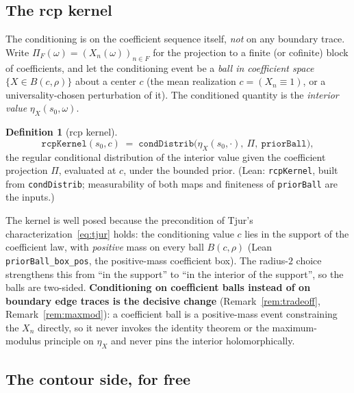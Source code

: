 \documentclass[11pt,a4paper]{article}
\theoremstyle{definition}
\newtheorem{definition}[theorem]{Definition}
\newcommand{\etaX}{\eta_X}
\begin{document}
\subsection{The rcp kernel}\label{sec:kernel}

The conditioning is on the coefficient sequence itself, \emph{not} on any boundary trace.
Write \(\Pi_F(\omega)=(X_n(\omega))_{n\in F}\) for the projection to a finite (or cofinite)
block of coefficients, and let the conditioning event be a \emph{ball in coefficient space}
\(\{X\in B(c,\rho)\}\) about a center \(c\) (the mean realization \(c=(X_n\equiv1)\), or a
universality-chosen perturbation of it). The conditioned quantity is the \emph{interior
value} \(\etaX(s_0,\omega)\).

\begin{definition}[rcp kernel]\label{def:kernel}
\[
  \texttt{rcpKernel}(s_0,c)
  \;=\; \texttt{condDistrib}\bigl(\etaX(s_0,\cdot),\ \Pi,\ \texttt{priorBall}\bigr),
\]
the regular conditional distribution of the interior value given the coefficient projection
\(\Pi\), evaluated at \(c\), under the bounded prior. (Lean: \texttt{rcpKernel}, built from
\texttt{condDistrib}; measurability of both maps and finiteness of \texttt{priorBall} are the
inputs.)
\end{definition}

The kernel is well posed because the precondition of Tjur's
characterization~\eqref{eq:tjur} holds: the conditioning value \(c\) lies in the support of
the coefficient law, with \emph{positive} mass on every ball \(B(c,\rho)\) (Lean
\texttt{priorBall\_box\_pos}, the positive-mass coefficient box). The radius-\(2\) choice
strengthens this from ``in the support'' to ``in the interior of the support'', so the balls
are two-sided. \textbf{Conditioning on coefficient balls instead of on boundary edge traces
is the decisive change} (Remark~\ref{rem:tradeoff}, Remark~\ref{rem:maxmod}): a coefficient
ball is a positive-mass event constraining the \(X_n\) directly, so it never invokes the
identity theorem or the maximum-modulus principle on \(\etaX\) and never pins the interior
holomorphically.

\subsection{The contour side, for free}
\end{document}
